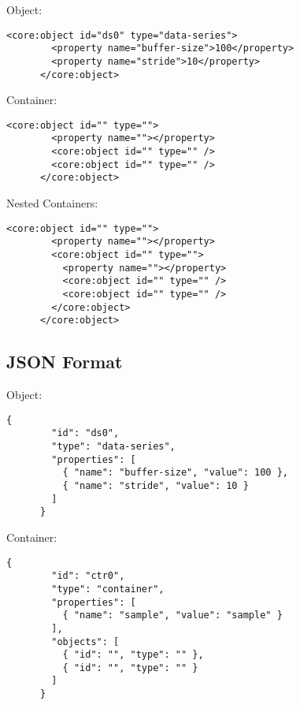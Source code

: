     Object:

    \begin{lstlisting}[caption={Object Configuration in XML},label={lst:cfg-xml-obj}]
      <core:object id="ds0" type="data-series">
        <property name="buffer-size">100</property>
        <property name="stride">10</property>
      </core:object>
    \end{lstlisting}

    Container:

    \begin{lstlisting}[caption={Container Configuration in XML},label={lst:cfg-xml-ctr}]
      <core:object id="" type="">
        <property name=""></property>
        <core:object id="" type="" />
        <core:object id="" type="" />
      </core:object>
    \end{lstlisting}

    Nested Containers:

    \begin{lstlisting}[caption={Nested Container Configuration in XML},label={lst:cfg-xml-nest-ctr}]
      <core:object id="" type="">
        <property name=""></property>
        <core:object id="" type="">
          <property name=""></property>
          <core:object id="" type="" />
          <core:object id="" type="" />
        </core:object>
      </core:object>
    \end{lstlisting}

  \subsection{JSON Format}\label{sec:cfg-json}

    Object:

    \begin{lstlisting}[caption={Object Configuration in JSON},label={lst:cfg-json-obj}]
      {
        "id": "ds0",
        "type": "data-series",
        "properties": [
          { "name": "buffer-size", "value": 100 },
          { "name": "stride", "value": 10 }
        ]
      }
    \end{lstlisting}

    Container:

    \begin{lstlisting}[caption={Container Configuration in JSON},label={lst:cfg-json-ctr}]
      {
        "id": "ctr0",
        "type": "container",
        "properties": [
          { "name": "sample", "value": "sample" }
        ],
        "objects": [
          { "id": "", "type": "" },
          { "id": "", "type": "" }
        ]
      }
    \end{lstlisting}

